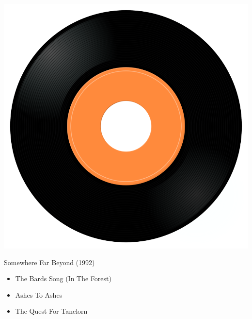 \begin{minipage}[t]{0.25\textwidth}
\captionsetup{type=figure}
\includegraphics[width=\textwidth]{Images/cover.png}
\caption*{Somewhere Far Beyond (1992)}
\end{minipage}
\begin{minipage}[t]{0.25\textwidth}\vspace{0pt}
\begin{itemize}[nosep,leftmargin=1em,labelwidth=*,align=left]
	\setlength{\itemsep}{0pt}
	\item The Bards Song (In The Forest)
	\item Ashes To Ashes
	\item The Quest For Tanelorn
\end{itemize}
\end{minipage}
